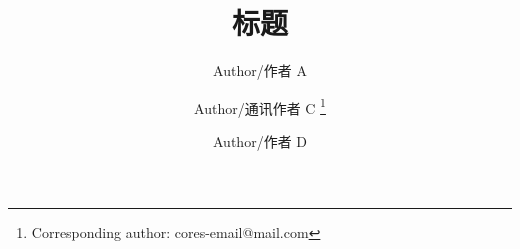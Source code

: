 \documentclass[10pt, oneside, AutoFakeBold, a4paper]{article}      %
\title{\hei 标题}
\author[a]{Author/作者 A}   %
\author[a]{Author/通讯作者 C \thanks{Corresponding author: cores-email@mail.com}}     %
\author[b]{Author/作者 D}									     %
\affil[a]{作者单位-1 \authorcr 地址}    %
\affil[b]{作者单位-2}			     %
\date{} %
\begin{document}
%
\renewcommand{\abstractname}{\small{\CJKfamily{hei} 摘\quad 要}} %
\renewcommand{\refname}{\centering\CJKfamily{hei} 参考文献}
\renewcommand{\figurename}{{\bf Fig}.}
\renewcommand{\tablename}{{\bf Tab}.}

\makeatletter
\long{}
\makeatother

\newcommand{\keywords}[1]{{\hspace{0pt}\small{\CJKfamily{hei} 关键词:}{\hspace{2ex}{#1}}\bigskip}}



\end{document}
